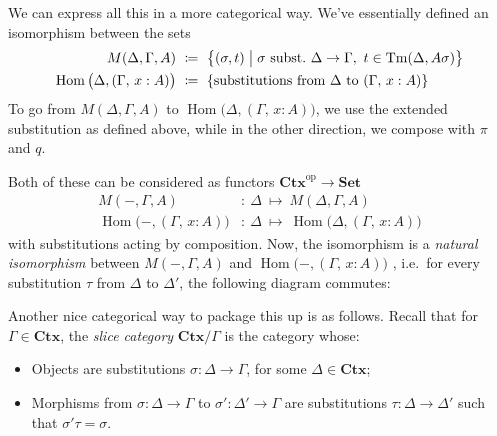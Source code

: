 \documentclass{article}
\theoremstyle{definition}
\newcommand{\comp}[2]{#2#1}%
\newcommand{\substType}[2]{#2#1}%
\newcommand{\extsub}[2]{\ang{#1,#2}}
\newcommand{\C}{\mathbf{Ctx}}
\newcommand{\Set}{\mathbf{Set}}
\newcommand{\Tm}{\mathrm{Tm}}
\newcommand{\op}[1]{{#1}^\mathrm{op}}           %
\DeclareMathOperator{\Hom}{Hom}
\newcommand{\defeq}{
	\mathrel{\mathrel{\mathop:}\mkern-1.2mu=}}	%
\newcommand{\ang}[1]{\mathopen{}\left\langle #1 \right\rangle\mathclose{}}
\newcommand{\pair}[2]{(#1,#2)}
\begin{document}
We can express all this in a more categorical way. We've essentially defined an isomorphism between the sets
\begin{align*}
    M(\Delta,\Gamma,A)\ &\defeq\ \big\{ \pair{\sigma}{t} \mathrel{\big|} \sigma \text{ subst.}\ \Delta \to \Gamma,\ t \in \Tm(\Delta, \substType{\sigma}{A}) \big\} \\
    \Hom \big( \Delta, (\Gamma,\, x : A) \big)\ &\defeq\ \{ \text{substitutions from } \Delta \text{ to } (\Gamma,\, x : A) \}
\end{align*}
To go from $M(\Delta,\Gamma,A)$ to $\Hom \big( \Delta, (\Gamma,\, x : A) \big)$, we use the extended substitution as defined above, while in the other direction, we compose with $\pi$ and $q$.

Both of these can be considered as functors $\op{\C} \to \Set$
\begin{align*}
    M(-,\Gamma,A)&\colon\ \Delta\ \mapsto\ M(\Delta,\Gamma,A) \\
    \Hom \big( -, (\Gamma,\, x : A) \big)&\colon\ \Delta\ \mapsto\ \Hom \big( \Delta, (\Gamma,\, x : A) \big)
\end{align*}
with substitutions acting by composition. Now, the isomorphism is a \textit{natural isomorphism} between $M(-,\Gamma,A)$ and $\Hom \big( -, (\Gamma,\, x : A) \big)$ \cite{gpoid}, i.e.\ for every substitution $\tau$ from $\Delta$ to $\Delta'$, the following diagram commutes:
\begin{center}
\end{center}

Another nice categorical way to package this up is as follows. Recall that for $\Gamma \in \C$, the \textit{slice category} $\C/\Gamma$ is the category whose:
\begin{itemize}
    \item Objects are substitutions $\sigma\colon \Delta \to \Gamma$, for some $\Delta \in \C$;
    
    \item Morphisms from $\sigma\colon \Delta \to \Gamma$ to $\sigma'\colon \Delta' \to \Gamma$ are substitutions $\tau\colon \Delta \to \Delta'$ such that $\comp{\tau}{\sigma'} = \sigma$.
\end{itemize}
\end{document}
